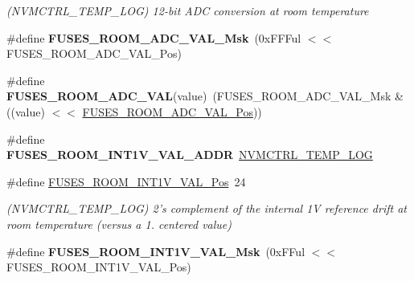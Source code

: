 \begin{DoxyCompactItemize}
\begin{DoxyCompactList}\small\item\em (N\+V\+M\+C\+T\+R\+L\+\_\+\+T\+E\+M\+P\+\_\+\+L\+O\+G) 12-\/bit A\+D\+C conversion at room temperature \end{DoxyCompactList}\item 
\hypertarget{group__fuses__api_gaa4fb448b0ef1d623e6c109535872d80b}{}\#define {\bfseries F\+U\+S\+E\+S\+\_\+\+R\+O\+O\+M\+\_\+\+A\+D\+C\+\_\+\+V\+A\+L\+\_\+\+Msk}~(0x\+F\+F\+Ful $<$$<$ F\+U\+S\+E\+S\+\_\+\+R\+O\+O\+M\+\_\+\+A\+D\+C\+\_\+\+V\+A\+L\+\_\+\+Pos)\label{group__fuses__api_gaa4fb448b0ef1d623e6c109535872d80b}

\item 
\hypertarget{group__fuses__api_ga7b4d8ebb648f2f48c4f6eb0250d2c6bb}{}\#define {\bfseries F\+U\+S\+E\+S\+\_\+\+R\+O\+O\+M\+\_\+\+A\+D\+C\+\_\+\+V\+A\+L}(value)~(F\+U\+S\+E\+S\+\_\+\+R\+O\+O\+M\+\_\+\+A\+D\+C\+\_\+\+V\+A\+L\+\_\+\+Msk \& ((value) $<$$<$ \hyperlink{group__fuses__api_ga91faceb6e2669f510f7a325fb1fd5748}{F\+U\+S\+E\+S\+\_\+\+R\+O\+O\+M\+\_\+\+A\+D\+C\+\_\+\+V\+A\+L\+\_\+\+Pos}))\label{group__fuses__api_ga7b4d8ebb648f2f48c4f6eb0250d2c6bb}

\item 
\hypertarget{group__fuses__api_ga04a2707338ea7270dda29b72dfe3b16d}{}\#define {\bfseries F\+U\+S\+E\+S\+\_\+\+R\+O\+O\+M\+\_\+\+I\+N\+T1\+V\+\_\+\+V\+A\+L\+\_\+\+A\+D\+D\+R}~\hyperlink{group___s_a_m_l21_j18_a__base_gae900d443ec6d7cf1c90d21b6662fa447}{N\+V\+M\+C\+T\+R\+L\+\_\+\+T\+E\+M\+P\+\_\+\+L\+O\+G}\label{group__fuses__api_ga04a2707338ea7270dda29b72dfe3b16d}

\item 
\hypertarget{group__fuses__api_gaac3dee19f6ada7e3e76edabd527b521d}{}\#define \hyperlink{group__fuses__api_gaac3dee19f6ada7e3e76edabd527b521d}{F\+U\+S\+E\+S\+\_\+\+R\+O\+O\+M\+\_\+\+I\+N\+T1\+V\+\_\+\+V\+A\+L\+\_\+\+Pos}~24\label{group__fuses__api_gaac3dee19f6ada7e3e76edabd527b521d}

\begin{DoxyCompactList}\small\item\em (N\+V\+M\+C\+T\+R\+L\+\_\+\+T\+E\+M\+P\+\_\+\+L\+O\+G) 2's complement of the internal 1\+V reference drift at room temperature (versus a 1. centered value) \end{DoxyCompactList}\item 
\hypertarget{group__fuses__api_ga063fd7b71cd24c82b856e96d490f3cd8}{}\#define {\bfseries F\+U\+S\+E\+S\+\_\+\+R\+O\+O\+M\+\_\+\+I\+N\+T1\+V\+\_\+\+V\+A\+L\+\_\+\+Msk}~(0x\+F\+Ful $<$$<$ F\+U\+S\+E\+S\+\_\+\+R\+O\+O\+M\+\_\+\+I\+N\+T1\+V\+\_\+\+V\+A\+L\+\_\+\+Pos)\label{group__fuses__api_ga063fd7b71cd24c82b856e96d490f3cd8}


\end{DoxyCompactItemize}
